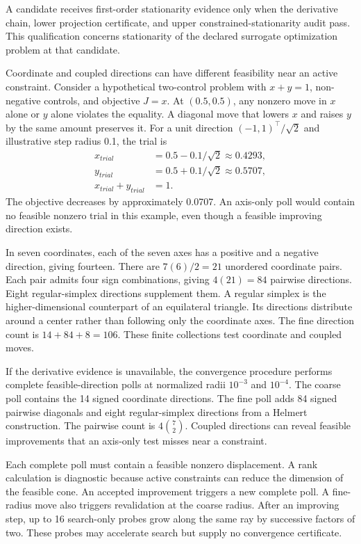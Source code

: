 A candidate receives first-order stationarity evidence only when the derivative chain, lower projection certificate, and upper constrained-stationarity audit pass. This qualification concerns stationarity of the declared surrogate optimization problem at that candidate.

Coordinate and coupled directions can have different feasibility near an active constraint. Consider a hypothetical two-control problem with $x+y=1$, non-negative controls, and objective $J=x$. At $(0.5,0.5)$, any nonzero move in $x$ alone or $y$ alone violates the equality. A diagonal move that lowers $x$ and raises $y$ by the same amount preserves it. For a unit direction $(-1,1)^\top/\sqrt2$ and illustrative step radius 0.1, the trial is
\[
\begin{aligned}
x_{trial}&=0.5-0.1/\sqrt2\approx0.4293,\\
y_{trial}&=0.5+0.1/\sqrt2\approx0.5707,\\
x_{trial}+y_{trial}&=1.
\end{aligned}
\]
The objective decreases by approximately 0.0707. An axis-only poll would contain no feasible nonzero trial in this example, even though a feasible improving direction exists.

In seven coordinates, each of the seven axes has a positive and a negative direction, giving fourteen. There are $7(6)/2=21$ unordered coordinate pairs. Each pair admits four sign combinations, giving $4(21)=84$ pairwise directions. Eight regular-simplex directions supplement them. A regular simplex is the higher-dimensional counterpart of an equilateral triangle. Its directions distribute around a center rather than following only the coordinate axes. The fine direction count is $14+84+8=106$. These finite collections test coordinate and coupled moves.

If the derivative evidence is unavailable, the convergence procedure performs complete feasible-direction polls at normalized radii $10^{-3}$ and $10^{-4}$. The coarse poll contains the 14 signed coordinate directions. The fine poll adds 84 signed pairwise diagonals and eight regular-simplex directions from a Helmert construction. The pairwise count is $4\binom72$. Coupled directions can reveal feasible improvements that an axis-only test misses near a constraint.

Each complete poll must contain a feasible nonzero displacement. A rank calculation is diagnostic because active constraints can reduce the dimension of the feasible cone. An accepted improvement triggers a new complete poll. A fine-radius move also triggers revalidation at the coarse radius. After an improving step, up to 16 search-only probes grow along the same ray by successive factors of two. These probes may accelerate search but supply no convergence certificate.


